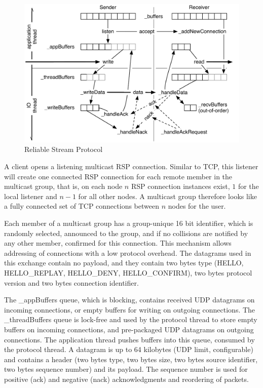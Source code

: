 \documentclass[10pt,journal,compsoc]{IEEEtran}
\begin{document}
\begin{figure}[ht]\center
  \includegraphics[width=\columnwidth]{images/rspPackets}
  \caption{\label{fRSPProto}Reliable Stream Protocol}
\end{figure}

A client opens a listening multicast RSP connection. Similar to TCP, this
listener will create one connected RSP connection for each remote member in the
multicast group, that is, on each node $n$ RSP connection instances exist, $1$
for the local listener and $n-1$ for all other nodes. A multicast group
therefore looks like a fully connected set of TCP connections between $n$ nodes
for the user.

Each member of a multicast group has a group-unique 16 bit identifier, which is
randomly selected, announced to the group, and if no collisions are notified by
any other member, confirmed for this connection. This mechanism allows
addressing of connections with a low protocol overhead. The datagrams used in
this exchange contain no payload, and they contain two bytes type (HELLO,
HELLO\_REPLAY, HELLO\_DENY, HELLO\_CONFIRM), two bytes protocol version and two
bytes connection identifier.

The \textsf{\_appBuffers} queue, which is blocking, contains received UDP
datagrams on incoming connections, or empty buffers for writing on outgoing
connections. The \textsf{\_threadBuffers} queue is lock-free and used by the
protocol thread to store empty buffers on incoming connections, and pre-packaged
UDP datagrams on outgoing connections. The application thread pushes buffers
into this queue, consumed by the protocol thread. A datagram is up to 64
kilobytes (UDP limit, configurable) and contains a header (two bytes type, two
bytes size, two bytes source identifier, two bytes sequence number) and its
payload. The sequence number is used for positive (ack) and negative (nack)
acknowledgments and reordering of packets.
\end{document}
